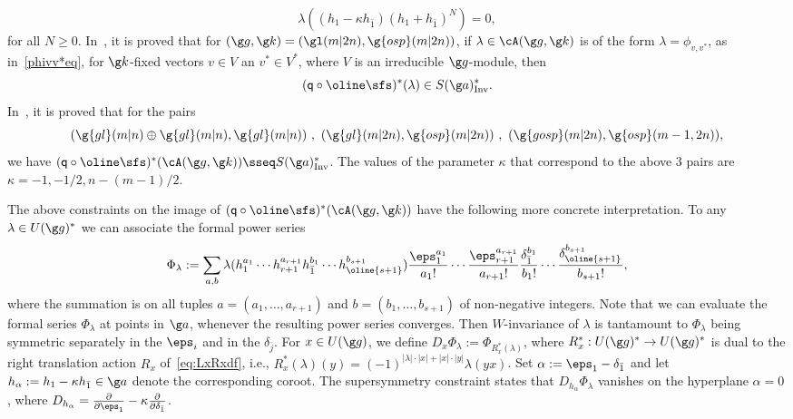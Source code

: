 \documentclass[11pt]{amsart}
\begin{document}
\begin{rmk}
\[\lambda((h_1-\kappa h_{\bar 1})(h_1+h_{\bar 1})^N)=0
,\] for all $N\geq 0$.
In~\cite[Prop. 5.7]{SergeevVeselovSym}, it is proved that for $(\g g,\g k)=(\gl(m|2n),\g{osp}(m|2n))$, if $\lambda\in \cA(\g g,\g k)$  is of the form $\lambda=\phi_{v,v^*}$, as in~\eqref{phivv*eq}, for $\g k$-fixed vectors $v\in V$ an $v^*\in V^*$, where $V$ is an irreducible $\g g$-module, then
\[
(\mathsf q\circ\oline\sfs)^*(\lambda)\in S(\g a)^*_\mathrm{Inv}
.
\] 
In~\cite{MitraThesis}, it is proved that for the pairs \[
(\g{gl}(m|n)\oplus\g{gl}(m|n),\g{gl}(m|n))\ ,\ 
(\g{gl}(m|2n),\g{osp}(m|2n))
\ ,\   
(\g{gosp}(m|2n),\g{osp}(m-1,2n)),
\] we have
$
(\mathsf q\circ\oline\sfs)^*(\cA(\g g,\g k))\sseq S(\g a)^*_\mathrm{Inv}
$.
The values of the parameter $\kappa$ that correspond to the above 3 pairs are $\kappa=-1,-1/2,n-(m-1)/2$.


The above constraints on the image of 
$(\mathsf q\circ\oline\sfs)^*(\cA(\g g,\g k))$ have the following more concrete interpretation. To any $\lambda\in U(\g g)^*$ we can associate the formal power series 
\[
\Phi_\lambda:=\sum_{a,b}\lambda(h_1^{a_1}\cdots h_{r+1}^{a_{r+1}}h_{\bar 1}^{b_1}\cdots h_{\oline{s+1}}^{b_{s+1}})
\frac{\eps_1^{a_1}}{a_1!}
\cdots
\frac{\eps_{r+1}^{a_{r+1}}}{a_{r+1}!}
\frac{\delta_{\bar 1}^{b_1}}{b_1!}
\cdots
\frac{\delta_{\oline{s+1}^{}}^{b_{s+1}}}{b_{s+1}!},
\]
where the summation is on all tuples $a=(a_1,\ldots,a_{r+1})$ and $b=(b_1,\ldots,b_{s+1})$ of non-negative integers. 
Note that we can evaluate the formal series $\Phi_\lambda$ at points in $\g a$, whenever the resulting power series  converges.  Then $W$-invariance of $\lambda$ is tantamount to $\Phi_\lambda$ being symmetric separately in the $\eps_i$ and in the $\delta_{\bar j}$. For $x\in U(\g g)$,  we define $D_x\Phi_\lambda:=\Phi_{R_x^*(\lambda)}$, where $R_x^*:U(\g g)^*\to U(\g g)^*$ is dual to the right translation action $R_x$ of~\eqref{eq:LxRxdf}, i.e., $R_x^*(\lambda)(y)=(-1)^{|\lambda|\cdot |x|+|x|\cdot |y|}\lambda(yx)$. Set $\alpha:=\eps_1-\delta_{\bar 1}$ and let $h_\alpha:=h_1-\kappa h_{\bar 1}\in\g a$ denote the corresponding coroot. The supersymmetry constraint states that $D_{h_\alpha}\Phi_\lambda$ vanishes on the hyperplane $\alpha=0$, where $D_{h_\alpha}=\frac{\partial}{\partial \eps_1}-\kappa\frac{\partial}{\partial \delta_{\bar 1}}$.


\end{rmk}
\end{document}
